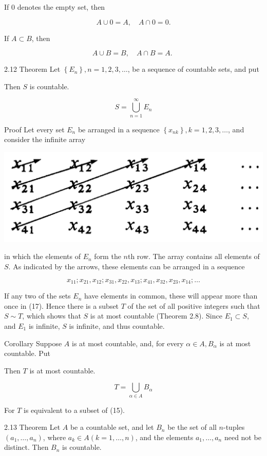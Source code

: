 \documentclass[10pt]{article}
\begin{document}
If 0 denotes the empty set, then

$$
A \cup 0=A, \quad A \cap 0=0 .
$$

If $A \subset B$, then

$$
A \cup B=B, \quad A \cap B=A \text {. }
$$

2.12 Theorem Let $\left\{E_{n}\right\}, n=1,2,3, \ldots$, be a sequence of countable sets, and put

Then $S$ is countable.

$$
S=\bigcup_{n=1}^{\infty} E_{n}
$$

Proof Let every set $E_{n}$ be arranged in a sequence $\left\{x_{n k}\right\}, k=1,2,3, \ldots$, and consider the infinite array

\begin{center}
\includegraphics[max width=\textwidth]{2023_08_17_055ccbec3ce53a1b74ebg-039}
\end{center}

in which the elements of $E_{n}$ form the $n$th row. The array contains all elements of $S$. As indicated by the arrows, these elements can be arranged in a sequence

$$
x_{11} ; x_{21}, x_{12} ; x_{31}, x_{22}, x_{13} ; x_{41}, x_{32}, x_{23}, x_{14} ; \ldots
$$

If any two of the sets $E_{n}$ have elements in common, these will appear more than once in (17). Hence there is a subset $T$ of the set of all positive integers such that $S \sim T$, which shows that $S$ is at most countable (Theorem 2.8). Since $E_{1} \subset S$, and $E_{1}$ is infinite, $S$ is infinite, and thus countable.

Corollary Suppose $A$ is at most countable, and, for every $\alpha \in A, B_{\alpha}$ is at most countable. Put

Then $T$ is at most countable.

$$
T=\bigcup_{\alpha \in A} B_{\alpha}
$$

For $T$ is equivalent to a subset of (15).

2.13 Theorem Let $A$ be a countable set, and let $B_{n}$ be the set of all $n$-tuples $\left(a_{1}, \ldots, a_{n}\right)$, where $a_{k} \in A(k=1, \ldots, n)$, and the elements $a_{1}, \ldots, a_{n}$ need not be distinct. Then $B_{n}$ is countable.
\end{document}

